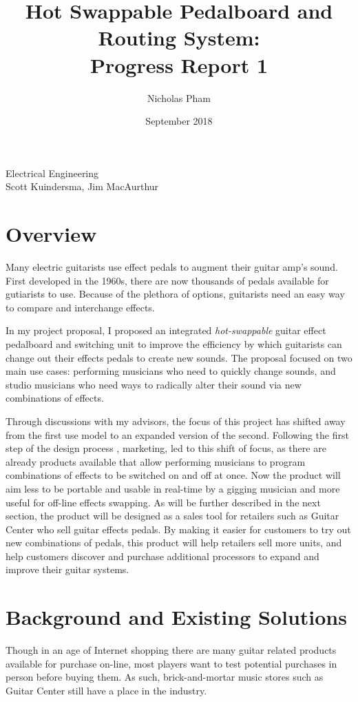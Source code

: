 \documentclass{article}
\title{Hot Swappable Pedalboard and Routing System:\\Progress Report 1}
\author{Nicholas Pham}
\date{September 2018}
\begin{document}
\maketitle
\begin{center}
    Electrical Engineering \\
    Scott Kuindersma, Jim MacAurthur
\end{center}

\section{Overview}
	Many electric guitarists use effect pedals to augment their guitar amp's sound.  First developed in the 1960s, there are now thousands of pedals available for gutiarists to use.  Because of the plethora of options, guitarists need an easy way to compare and interchange effects.

	In my project proposal, I proposed an integrated \emph{hot-swappable} guitar effect pedalboard and switching unit to improve the efficiency by which guitarists can change out their effects pedals to create new sounds.  The proposal focused on two main use cases: performing musicians who need to quickly change sounds, and studio musicians who need ways to radically alter their sound via new combinations of effects.

	Through discussions with my advisors, the focus of this project has shifted away from the first use model to an expanded version of the second.  Following the first step of the design process \cite{ES100Lec3}, marketing, led to this shift of focus, as there are already products available that allow performing musicians to program combinations of effects to be switched on and off at once.  Now the product will aim less to be portable and usable in real-time by a gigging musician and more useful for off-line effects swapping.  As will be further described in the next section, the product will be designed as a sales tool for retailers such as Guitar Center who sell guitar effects pedals.  By making it easier for customers to try out new combinations of pedals, this product will help retailers sell more units, and help customers discover and purchase additional processors to expand and improve their guitar systems.

\section{Background and Existing Solutions}
	Though in an age of Internet shopping there are many guitar related products available for purchase on-line, most players want to test potential purchases in person before buying them.  As such, brick-and-mortar music stores such as Guitar Center still have a place in the industry.
\end{document}
